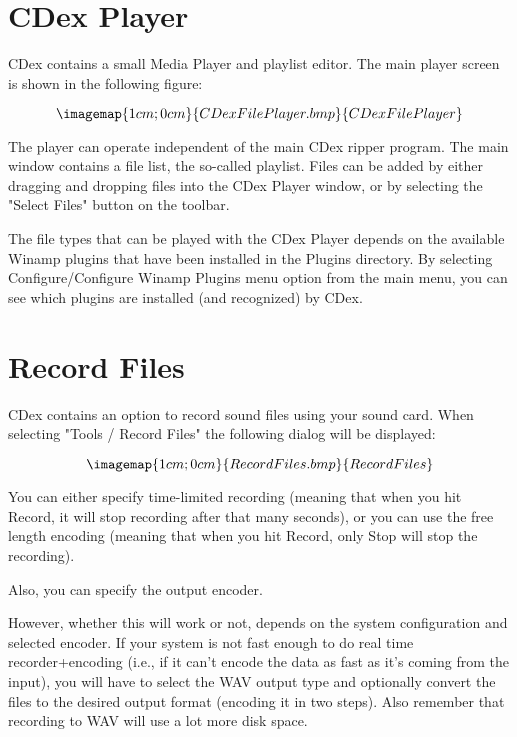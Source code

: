 \chapter{CDex Player}\label{cdexplayer}
\setfooter{\thepage}{}{}{}{}{\thepage}

CDex contains a small Media Player and playlist editor. The main player screen
is shown in the following figure:

$$\imagemap{1cm;0cm}{CDexFilePlayer.bmp}{CDexFilePlayer}$$

The player can operate independent of the main CDex ripper program. The main window contains
a file list, the so-called playlist. Files can be added by either dragging
and dropping files into the CDex Player window, or by selecting the "Select Files"
button on the toolbar. 

The file types that can be played with the CDex Player depends on the available
Winamp plugins that have been installed in the Plugins directory. By selecting
Configure/Configure Winamp Plugins menu option from the main menu, you can see
which plugins are installed (and recognized) by CDex. 


\chapter{Record Files}\label{recordfiles}
\setfooter{\thepage}{}{}{}{}{\thepage}

CDex contains an option to record sound files using your sound card. When selecting 
"Tools / Record Files" the following dialog will be displayed:

$$\imagemap{1cm;0cm}{RecordFiles.bmp}{RecordFiles}$$

You can either specify time-limited recording (meaning that when
you hit Record, it will stop recording after that many seconds), or you can use the free length
encoding (meaning that when you hit Record, only Stop will stop the recording).

Also, you can specify the output encoder.

However, whether this will work or not, depends on the
system configuration and selected encoder.  If your system
is not fast enough to do real time recorder+encoding (i.e., if it can't encode the data
as fast as it's coming from the input), you will have to select the WAV output
type and optionally convert the files to the desired output format (encoding it in two
steps).  Also remember that recording to WAV will use a lot more disk space.

